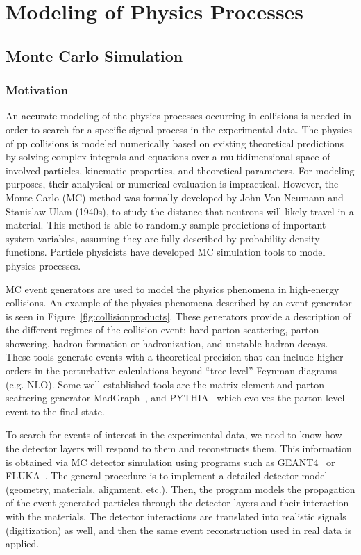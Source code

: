 \chapter{Modeling of Physics Processes} 
\label{chapter:modeling}

\section{Monte Carlo Simulation}
\subsection{Motivation} \label{subsection:simulation}

An accurate modeling of the physics processes occurring in collisions is needed in order to search for a specific signal process in the experimental data. The physics of pp collisions is modeled numerically based on existing theoretical predictions by solving complex integrals and equations over a multidimensional space of involved particles, kinematic properties, and theoretical parameters. For modeling purposes, their analytical or numerical evaluation is impractical. However, the Monte Carlo (MC) method was formally developed by John Von Neumann and Stanislaw Ulam (1940s), to study the distance that neutrons will likely travel in a material. This method is able to randomly sample predictions of important system variables, assuming they are fully described by probability density functions. Particle physicists have developed MC simulation tools to model physics processes.

MC event generators are used to model the physics phenomena in high-energy collisions. An example of the physics phenomena described by an event generator is seen in Figure~\ref{fig:collisionproducts}. These generators provide a description of the different regimes of the collision event: hard parton scattering, parton showering, hadron formation or hadronization, and unstable hadron decays. These tools generate events with a theoretical precision that can include higher orders in the perturbative calculations beyond “tree-level” Feynman diagrams (e.g. NLO). Some well-established tools are the matrix element and parton scattering generator MadGraph~\cite{Alwall:2014hca}, and PYTHIA~\cite{Sjostrand:2014zea} which evolves the parton-level event to the final state. 

To search for events of interest in the experimental data, we need to know how the detector layers will respond to them and reconstructs them. This information is obtained via MC detector simulation using programs such as GEANT4~\cite{Agostinelli:2002hh} or FLUKA~\cite{Ferrari:2005zk}. The general procedure is to implement a detailed detector model (geometry, materials, alignment, etc.). Then, the program models the propagation of the event generated particles through the detector layers and their interaction with the materials. The detector interactions are translated into realistic signals (digitization) as well, and then the same event reconstruction used in real data is applied.

